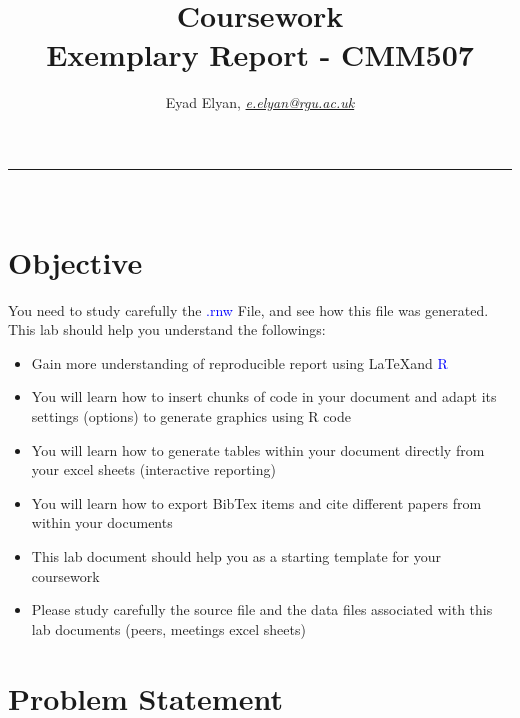 \documentclass[10pt]{article}\usepackage[]{graphicx}\usepackage[]{color}
\begin{document}
\title{\LARGE Coursework  \\ Exemplary Report - CMM507}

\author{Eyad Elyan, \textit{\href{e.elyan@rgu.ac.uk}{e.elyan@rgu.ac.uk}}}
\maketitle
\noindent\rule{16cm}{0.4pt}
\ \\

\section*{Objective}

You need to study carefully the \textcolor{blue}{.rnw} File, and see how this file was generated. This lab should help you understand the followings:

\begin{itemize}
\item Gain more understanding of reproducible report using \LaTeX and \textcolor{blue}{R}
\item You will learn how to insert chunks of code in your document and adapt its settings (options) to generate graphics using R code 
\item You will learn how to generate tables within your document directly from your excel sheets (interactive reporting)
\item You will learn how to export BibTex items and cite different papers from within your documents 
\item This lab document should help you as a starting template for your coursework
\item Please study carefully the source file and the data files associated with this lab documents (peers, meetings excel sheets)

\end{itemize}

\section{Problem Statement}\label{statement}

\blindtext[2]
\end{document}
